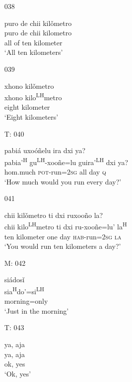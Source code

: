 \begin{itemize}
\item[038]
 
\glll   puro de chii kil\v{o}metro \\
puro de chii kilometro \\
all of ten kilometer \\
\glt `All ten kilometers' \\
 


\item[039]
 
\glll    xhono kil\v{o}metro \\
 xhono kilo\textsuperscript{LH}metro \\
eight kilometer \\
\glt `Eight kilometers'
 

 
 
\item[T: 040]
 
\glll   pabi\'{a} uxo\'{o}\~{n}elu ira dxi ya? \\
pabia'\textsuperscript{H} gu\textsuperscript{LH}-xoo\~{n}e=lu guira'\textsuperscript{LH} dxi ya? \\
hom.much \textsc{pot}-run=\textsc{2sg} all day \textsc{q} \\
\glt `How much would you run every day?'
 

\item[041]
 
\glll   chii kil\v{o}metro ti dxi ruxoo\~{n}o la? \\
 chii kilo\textsuperscript{LH}metro ti dxi ru-xoo\~{n}e=lu' la\textsuperscript{H} \\
 ten kilometer one day \textsc{hab}-run=\textsc{2sg} \textsc{la} \\
\glt `You would run ten kilometers a day?' 
 

\item[M: 042]
 
\glll   si\'{a}dos\v{i} \\
sia\textsuperscript{H}do'=si\textsuperscript{LH} \\
morning=only \\
\glt `Just in the morning'
 

\item[T: 043]
 
\glll   ya, aja \\
ya, aja \\
ok, yes \\
\glt `Ok, yes'
 



\end{itemize}
